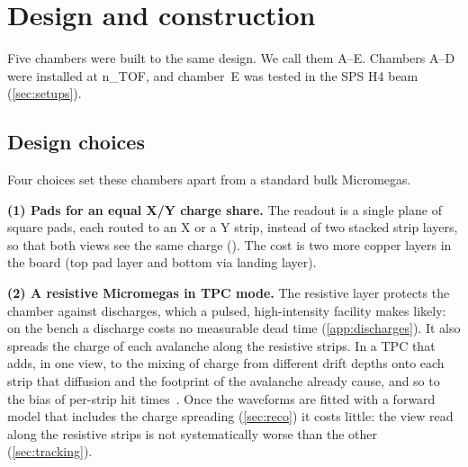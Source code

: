 \section{Design and construction}\label{sec:design}

Five chambers were built to the same design. We call them A--E. Chambers A--D were installed at n\_TOF, and chamber~E was
tested in the SPS H4 beam (\cref{sec:setups}).

\subsection{Design choices}\label{sec:design_choices}
Four choices set these chambers apart from a standard bulk Micromegas.

\textbf{(1) Pads for an equal X/Y charge share.} The readout is a single plane of square pads, each routed to an X
or a Y strip, instead of two stacked strip layers, so that both views see the same charge
(). The cost is two more copper layers in the board (top pad layer and bottom via landing layer).

\textbf{(2) A resistive Micromegas in TPC mode.} The resistive layer protects the chamber against discharges, which a
pulsed, high-intensity facility makes likely: on the bench a discharge costs no measurable dead time
(\cref{app:discharges}). It also spreads the charge of each avalanche along the resistive strips. In a TPC that adds, in
one view, to the mixing of charge from different drift depths onto each strip that diffusion and the footprint of the
avalanche already cause, and so to the bias of per-strip hit times~\cite{paperIIb}. Once the waveforms are fitted with
a forward model that includes the charge spreading (\cref{sec:reco}) it costs little: the view read along the resistive strips is not
systematically worse than the other (\cref{sec:tracking}).

